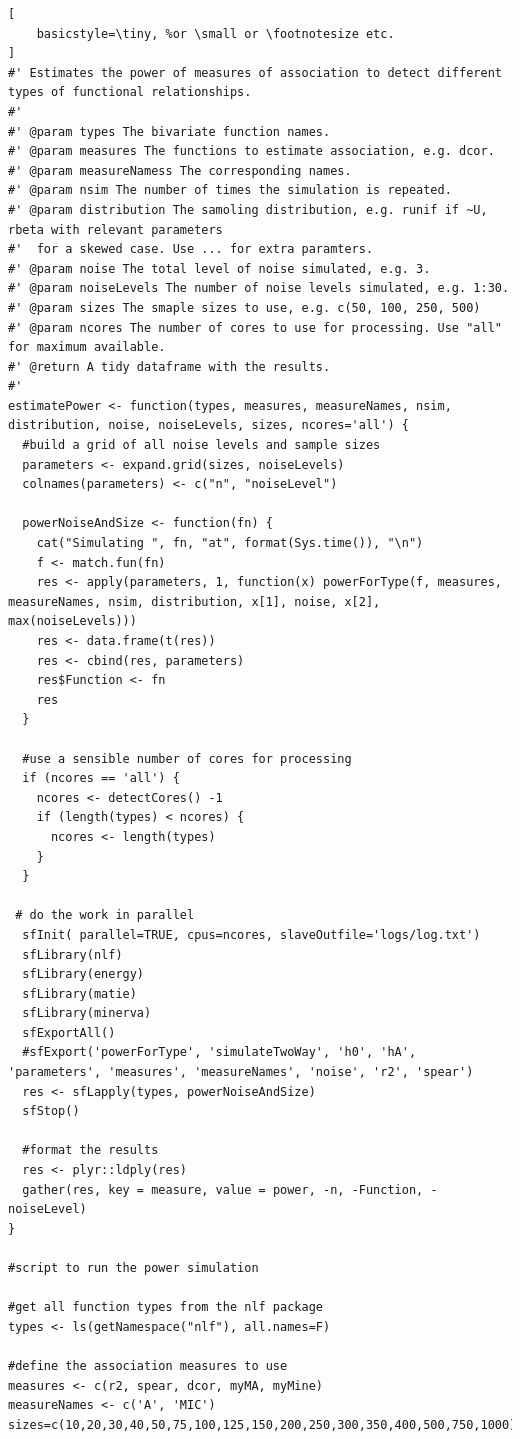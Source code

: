 \documentclass[a4paper, 12pt]{report}
\begin{document}
\begin{lstlisting}[
    basicstyle=\tiny, %or \small or \footnotesize etc.
]
#' Estimates the power of measures of association to detect different types of functional relationships.
#'
#' @param types The bivariate function names.
#' @param measures The functions to estimate association, e.g. dcor.
#' @param measureNamess The corresponding names.
#' @param nsim The number of times the simulation is repeated.
#' @param distribution The samoling distribution, e.g. runif if ~U, rbeta with relevant parameters 
#'  for a skewed case. Use ... for extra paramters.
#' @param noise The total level of noise simulated, e.g. 3.
#' @param noiseLevels The number of noise levels simulated, e.g. 1:30.
#' @param sizes The smaple sizes to use, e.g. c(50, 100, 250, 500)
#' @param ncores The number of cores to use for processing. Use "all" for maximum available.
#' @return A tidy dataframe with the results.
#' 
estimatePower <- function(types, measures, measureNames, nsim, distribution, noise, noiseLevels, sizes, ncores='all') {
  #build a grid of all noise levels and sample sizes
  parameters <- expand.grid(sizes, noiseLevels)
  colnames(parameters) <- c("n", "noiseLevel")
  
  powerNoiseAndSize <- function(fn) {
    cat("Simulating ", fn, "at", format(Sys.time()), "\n")
    f <- match.fun(fn)   
    res <- apply(parameters, 1, function(x) powerForType(f, measures, measureNames, nsim, distribution, x[1], noise, x[2], max(noiseLevels)))
    res <- data.frame(t(res))
    res <- cbind(res, parameters)
    res$Function <- fn
    res
  }
  
  #use a sensible number of cores for processing
  if (ncores == 'all') {
    ncores <- detectCores() -1
    if (length(types) < ncores) {
      ncores <- length(types)
    }
  }

 # do the work in parallel
  sfInit( parallel=TRUE, cpus=ncores, slaveOutfile='logs/log.txt')
  sfLibrary(nlf)
  sfLibrary(energy)
  sfLibrary(matie)
  sfLibrary(minerva)
  sfExportAll()
  #sfExport('powerForType', 'simulateTwoWay', 'h0', 'hA', 'parameters', 'measures', 'measureNames', 'noise', 'r2', 'spear')
  res <- sfLapply(types, powerNoiseAndSize)
  sfStop()
  
  #format the results
  res <- plyr::ldply(res)
  gather(res, key = measure, value = power, -n, -Function, -noiseLevel)
}

#script to run the power simulation

#get all function types from the nlf package
types <- ls(getNamespace("nlf"), all.names=F)

#define the association measures to use
measures <- c(r2, spear, dcor, myMA, myMine)
measureNames <- c('A', 'MIC')
sizes=c(10,20,30,40,50,75,100,125,150,200,250,300,350,400,500,750,1000)


\end{lstlisting}
\end{document}
